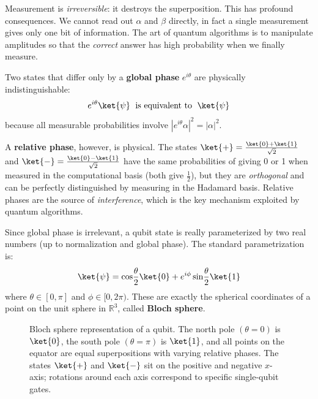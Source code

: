 \documentclass[oneside]{academica}
\begin{document}
\begin{note}
  Measurement is \emph{irreversible}: it destroys the superposition.
  This has profound consequences.
  We cannot read out $\alpha$ and $\beta$ directly, in fact a single measurement gives only one bit of information.
  The art of quantum algorithms is to manipulate amplitudes so that the \emph{correct} answer has high probability when we finally measure.
\end{note}

Two states that differ only by a \textbf{global phase} $e^{i\theta}$ are physically indistinguishable:
\begin{equation*}
  e^{i\theta}\ket{\psi} \;\text{ is equivalent to }\; \ket{\psi}
\end{equation*}
because all measurable probabilities involve $|e^{i\theta}\alpha|^2=|\alpha|^2$.

A \textbf{relative phase}, however, is physical.
The states $\ket{+}=\frac{\ket{0}+\ket{1}}{\sqrt{2}}$ and $\ket{-}=\frac{\ket{0}-\ket{1}}{\sqrt{2}}$ have the same probabilities of giving 0 or 1 when measured in the computational basis (both give $\frac{1}{2}$), but they are \emph{orthogonal} and can be perfectly distinguished by measuring in the Hadamard basis.
Relative phases are the source of \emph{interference}, which is the key mechanism exploited by quantum algorithms.

Since global phase is irrelevant, a qubit state is really parameterized by two real numbers (up to normalization and global phase).
The standard parametrization is:
\begin{equation*}
  \ket{\psi}=\cos\!\frac{\theta}{2}\ket{0}+e^{i\phi}\sin\!\frac{\theta}{2}\ket{1}
\end{equation*}
where $\theta\in[0,\pi]$ and $\phi\in[0,2\pi)$.
These are exactly the spherical coordinates of a point on the unit sphere in $\mathbb{R}^3$, called \textbf{Bloch sphere}.

\begin{figure}[H]
  \begin{center}
    
  \end{center}
  \caption{Bloch sphere representation of a qubit.
    The north pole $(\theta=0)$ is $\ket{0}$, the south pole $(\theta=\pi)$ is $\ket{1}$, and all points on the equator are equal superpositions with varying relative phases.
    The states $\ket{+}$ and $\ket{-}$ sit on the positive and negative $x$-axis; rotations around each axis correspond to specific single-qubit gates.
  }
\end{figure}
\end{document}
